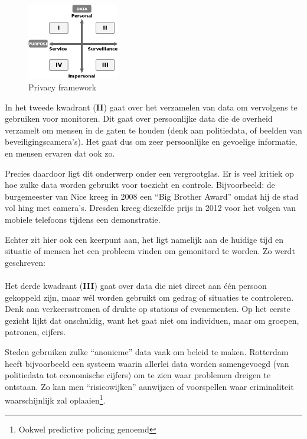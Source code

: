 \documentclass[nonacm,sigconf]{acmart}
\begin{document}
    \begin{figure}[h]
        \centering
        \includegraphics[width=40mm]{images/SmartCityPrivacy}
        \caption{Privacy framework {\parencite[nagemaakt van][]{van2016privacy}}}
        \label{fig:privacy_framework}
    \end{figure}

    In het tweede kwadrant (\textbf{II}) gaat over het verzamelen van data om vervolgens te gebruiken voor monitoren.
    Dit gaat over persoonlijke data die de overheid verzamelt om mensen in de gaten te houden (denk aan politiedata, of beelden van beveiligingscamera’s).
    Het gaat dus om zeer persoonlijke en gevoelige informatie, en mensen ervaren dat ook zo.

    Precies daardoor ligt dit onderwerp onder een vergrootglas.
    Er is veel kritiek op hoe zulke data worden gebruikt voor toezicht en controle.
    Bijvoorbeeld: de burgemeester van Nice kreeg in 2008 een “Big Brother Award” omdat hij de stad vol hing met camera’s.
    Dresden kreeg diezelfde prijs in 2012 voor het volgen van mobiele telefoons tijdens een demonstratie.

    Echter zit hier ook een keerpunt aan, het ligt namelijk aan de huidige tijd en situatie of mensen het een probleem vinden om gemonitord te worden.
    Zo werdt geschreven:
    \\
    \\
    Het derde kwadrant (\textbf{III}) gaat over data die niet direct aan één persoon gekoppeld zijn, maar wél worden gebruikt om gedrag of situaties te controleren.
    Denk aan verkeersstromen of drukte op stations of evenementen.
    Op het eerste gezicht lijkt dat onschuldig, want het gaat niet om individuen, maar om groepen, patronen, cijfers.

    Steden gebruiken zulke “anonieme” data vaak om beleid te maken.
    Rotterdam heeft bijvoorbeeld een systeem waarin allerlei data worden samengevoegd (van politiedata tot economische cijfers) om te zien waar problemen dreigen te ontstaan.
    Zo kan men “risicowijken” aanwijzen of voorspellen waar criminaliteit waarschijnlijk zal oplaaien\footnote{Ookwel predictive policing genoemd}.
\end{document}
